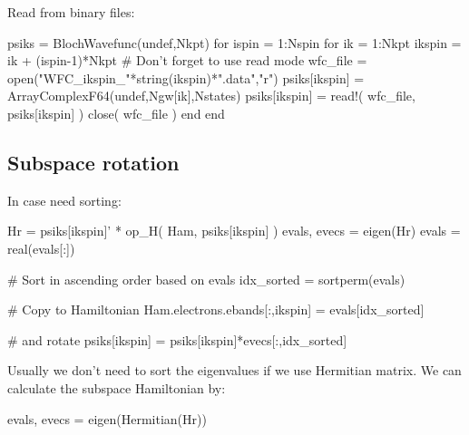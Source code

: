 Read from binary files:
\begin{juliacode}
psiks = BlochWavefunc(undef,Nkpt)
for ispin = 1:Nspin
for ik = 1:Nkpt
    ikspin = ik + (ispin-1)*Nkpt
    # Don't forget to use read mode
    wfc_file = open("WFC_ikspin_"*string(ikspin)*".data","r")
    psiks[ikspin] = Array{ComplexF64}(undef,Ngw[ik],Nstates)
    psiks[ikspin] = read!( wfc_file, psiks[ikspin] )
    close( wfc_file )
end
end
\end{juliacode}




\subsection*{Subspace rotation}

In case need sorting:
\begin{juliacode}
Hr = psiks[ikspin]' * op_H( Ham, psiks[ikspin] )
evals, evecs = eigen(Hr)
evals = real(evals[:])

# Sort in ascending order based on evals 
idx_sorted = sortperm(evals)

# Copy to Hamiltonian
Ham.electrons.ebands[:,ikspin] = evals[idx_sorted]

# and rotate
psiks[ikspin] = psiks[ikspin]*evecs[:,idx_sorted]
\end{juliacode}

Usually we don't need to sort the eigenvalues if we use Hermitian matrix. We can calculate the
subspace Hamiltonian by:
\begin{juliacode}
evals, evecs = eigen(Hermitian(Hr))
\end{juliacode}
